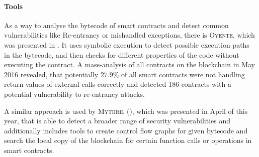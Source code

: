 \paragraph{Tools}
As a way to analyse the bytecode of smart contracts and detect common vulnerabilities like Re-entrancy or mishandled exceptions, there is \textsc{Oyente}, which was presented in \cite{luu:makingsmartcontractssmarter}. It uses symbolic execution to detect possible execution paths in the bytecode, and then checks for different properties of the code without executing the contract. A mass-analysis of all contracts on the blockchain in May 2016 revealed, that potentially \( 27.9 \% \) of all smart contracts were not handling return values of external calls correctly and detected 186 contracts with a potential vulnerability to re-entrancy attacks.

A similar approach is used by \textsc{Mythril} (\cite{consensys:mythril}), which was presented in April of this year, that is able to detect a broader range of security vulnerabilities and additionally includes tools to create control flow graphs for given bytecode and search the local copy of the blockchain for certain function calls or operations in smart contracts.

\pagebreak{}
